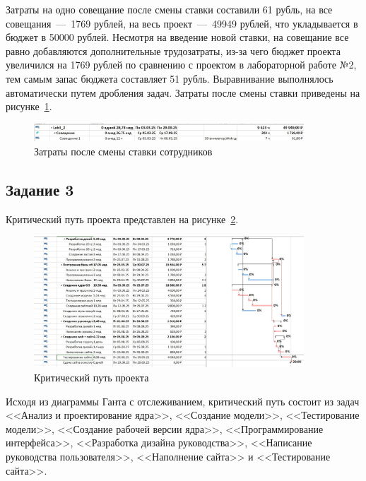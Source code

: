 Затраты на одно совещание после смены ставки составили 61 рубль, на все совещания~---~1769 рублей, на весь проект~---~49949 рублей, что укладывается в бюджет в 50000 рублей.
Несмотря на введение новой ставки, на совещание все равно добавляются дополнительные трудозатраты, из-за чего бюджет проекта увеличился на 1769 рублей по сравнению с проектом в лабораторной работе №2, тем самым запас бюджета составляет 51 рубль.
Выравнивание выполнялось автоматически путем дробления задач.
Затраты после смены ставки приведены на рисунке~\ref{fig:screen2_5}.

\begin{figure}[H]
	\centering
	\includegraphics[width=0.9\textwidth]{img/lab3/task2/screen5.jpg}
	\caption{Затраты после смены ставки сотрудников}
	\label{fig:screen2_5}
\end{figure}

\subsection{Задание 3}

Критический путь проекта представлен на рисунке~\ref{fig:screen3_1}.

\begin{figure}[H]
	\centering
	\includegraphics[width=0.9\textwidth]{img/lab3/task3/screen1.jpg}
	\caption{Критический путь проекта}
	\label{fig:screen3_1}
\end{figure}

Исходя из диаграммы Ганта с отслеживанием, критический путь состоит из задач <<Анализ и проектирование ядра>>, <<Создание модели>>, <<Тестирование модели>>, <<Создание рабочей версии ядра>>, <<Программирование интерфейса>>, <<Разработка дизайна руководства>>, <<Написание руководства пользователя>>, <<Наполнение сайта>> и <<Тестирование сайта>>.

